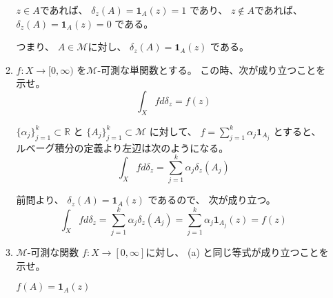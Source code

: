 \documentclass[12pt,b5paper]{ltjsarticle}
\begin{document}
\begin{enumerate}
\begin{enumerate}
            $z\in A$であれば、
            $\delta_{z}(A) = \mathbf{1}_{A}(z)=1$
            であり、
            $z\not\in A$であれば、
            $\delta_{z}(A) = \mathbf{1}_{A}(z)=0$
            である。

            つまり、
            $A\in\mathcal{M}$に対し、
            $\delta_{z}(A) = \mathbf{1}_{A}(z)$
            である。


            \hrulefill

       \item
            $f: X \to [0,\infty)$
            を$\mathcal{M}$-可測な単関数とする。
            この時、次が成り立つことを示せ。
            \begin{equation}
             \int_{X} f d\delta_{z} =f(z)
            \end{equation}

            \dotfill


            $\{\alpha_{j}\}_{j=1}^{k} \subset \mathbb{R}$
            と
            $\{A_{j}\}_{j=1}^{k} \subset \mathcal{M}$
            に対して、
            $f=\sum_{j=1}^{k}\alpha_{j}\mathbf{1}_{A_{j}}$
            とすると、
            ルベーグ積分の定義より左辺は次のようになる。
            \begin{equation}
             \int_{X} f d\delta_{z} = \sum_{j=1}^{k}\alpha_{j}\delta_{z}(A_{j})
            \end{equation}

            前問より、
            $\delta_{z}(A) = \mathbf{1}_{A}(z)$
            であるので、
            次が成り立つ。
            \begin{equation}
             \int_{X} f d\delta_{z}
              = \sum_{j=1}^{k}\alpha_{j}\delta_{z}(A_{j})
              = \sum_{j=1}^{k}\alpha_{j}\mathbf{1}_{A_{j}}(z)
              = f(z)
            \end{equation}

            \hrulefill

       \item
            $\mathcal{M}$-可測な関数
            $f: X \to [0,\infty]$に対し、
            (a) %
            と同じ等式が成り立つことを示せ。

            \dotfill


            $f(A) = \mathbf{1}_{A}(z)$



            \hrulefill

      \end{enumerate}



\end{enumerate}

\hrulefill
\end{document}
